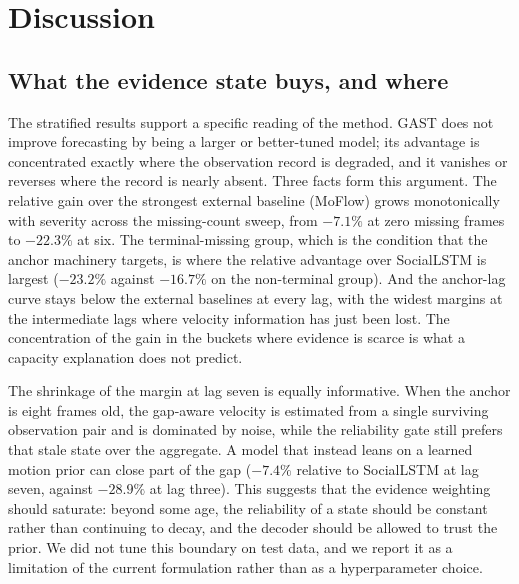 \section{Discussion}
\label{sec:disc}

\subsection{What the evidence state buys, and where}
The stratified results support a specific reading of the method. GAST does not improve forecasting by being a larger or better-tuned model; its advantage is concentrated exactly where the observation record is degraded, and it vanishes or reverses where the record is nearly absent. Three facts form this argument. The relative gain over the strongest external baseline (MoFlow) grows monotonically with severity across the missing-count sweep, from $-7.1\%$ at zero missing frames to $-22.3\%$ at six. The terminal-missing group, which is the condition that the anchor machinery targets, is where the relative advantage over SocialLSTM is largest ($-23.2\%$ against $-16.7\%$ on the non-terminal group). And the anchor-lag curve stays below the external baselines at every lag, with the widest margins at the intermediate lags where velocity information has just been lost. The concentration of the gain in the buckets where evidence is scarce is what a capacity explanation does not predict.

The shrinkage of the margin at lag seven is equally informative. When the anchor is eight frames old, the gap-aware velocity is estimated from a single surviving observation pair and is dominated by noise, while the reliability gate still prefers that stale state over the aggregate. A model that instead leans on a learned motion prior can close part of the gap ($-7.4\%$ relative to SocialLSTM at lag seven, against $-28.9\%$ at lag three). This suggests that the evidence weighting should saturate: beyond some age, the reliability of a state should be constant rather than continuing to decay, and the decoder should be allowed to trust the prior. We did not tune this boundary on test data, and we report it as a limitation of the current formulation rather than as a hyperparameter choice.

